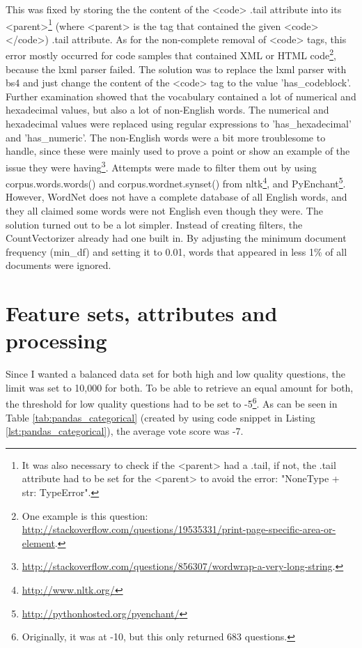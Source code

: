 This was fixed by storing the the content of the <code> .tail attribute into its <parent>\footnote{
	It was also necessary to check if the <parent> had a .tail, if not, the .tail attribute had to be set for the <parent> to avoid the error: 
	"NoneType + str: TypeError".
	} 
(where <parent> is the tag that contained the given <code></code>) .tail attribute. 
As for the non-complete removal of <code> tags, this error mostly occurred for code samples that contained XML or HTML code\footnote{
	One example is this question: \\
	\url{http://stackoverflow.com/questions/19535331/print-page-specific-area-or-element}.
	}, 
because the lxml parser failed. 
The solution was to replace the lxml parser with bs4 and just change the content of the <code> tag to the value 'has\_codeblock'.
\vspace{0.5em}\newline
Further examination showed that the vocabulary contained a lot of numerical and hexadecimal values, but also a lot of non-English words. 
The numerical and hexadecimal values were replaced using regular expressions to 'has\_hexadecimal' and 'has\_numeric'. 
The non-English words were a bit more troublesome to handle, since these were mainly used to prove a point or show an example of the issue they were having\footnote{ 
	\url{http://stackoverflow.com/questions/856307/wordwrap-a-very-long-string}.
	}. 
Attempts were made to filter them out by using corpus.words.words() and corpus.wordnet.synset() 
from \gls{nltk}\footnote{\url{http://www.nltk.org/}}, and PyEnchant\footnote{\url{http://pythonhosted.org/pyenchant/}}. 
However, WordNet does not have a complete database of all English words, and they all claimed some words were not English even though they were.
The solution turned out to be a lot simpler. 
Instead of creating filters, the CountVectorizer already had one built in. 
By adjusting the minimum document frequency (min\_df) and setting it to 0.01, words that appeared in less 1\% of all documents were ignored.


\section{Feature sets, attributes and processing}
\label{sec:feature_sets}
Since I wanted a balanced data set for both high and low quality questions, the limit was set to 10,000 for both.
To be able to retrieve an equal amount for both, the threshold for low quality questions had to be set to -5\footnote{
	Originally, it was at -10, but this only returned 683 questions. 
}.
As can be seen in Table \ref{tab:pandas_categorical} (created by using code snippet in Listing \ref{lst:pandas_categorical}), the average vote score was -7.

